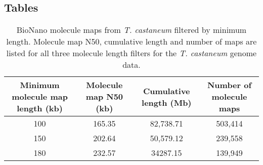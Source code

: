 \documentclass{bmcart}
\begin{document}
\begin{backmatter}


\section*{Tables}

\begin{table}[h!]
\caption{BioNano molecule maps from \textit{T. castaneum} filtered by minimum length. Molecule map N50, cumulative length and number of maps are listed for all three molecule length filters for the \textit{T. castaneum} genome data.}
      \begin{tabular}{cccc}
        \hline
         Minimum molecule map length (kb) & Molecule map N50 (kb) & Cumulative length (Mb) & Number of molecule maps\\ \hline
        100 & 165.35 & 82,738.71 & 503,414 \\
        150 & 202.64 & 50,579.12 & 239,558 \\ 
        180 & 232.57 & 34287.15 & 139,949 \\ \hline  
      \end{tabular}
\end{table}


\end{backmatter}
\end{document}

